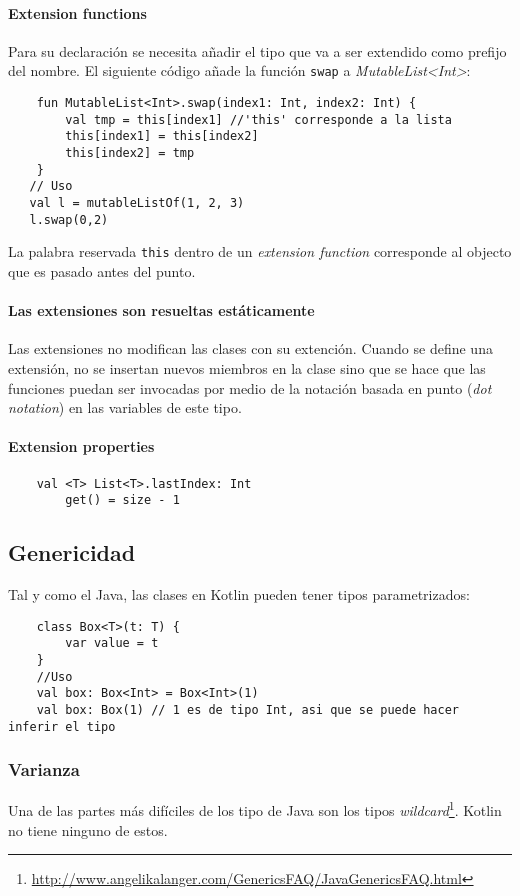\paragraph{Extension functions} Para su declaración se necesita añadir el tipo que va a ser extendido como prefijo del nombre. El siguiente código añade la función \texttt{swap} a \emph{MutableList<Int>}:
\begin{verbatim}
    fun MutableList<Int>.swap(index1: Int, index2: Int) {
        val tmp = this[index1] //'this' corresponde a la lista
        this[index1] = this[index2]
        this[index2] = tmp
    }
   // Uso
   val l = mutableListOf(1, 2, 3)
   l.swap(0,2) 
\end{verbatim}
La palabra reservada \texttt{this} dentro de un \emph{extension function} corresponde al objecto que es pasado antes del punto.

\paragraph{Las extensiones son resueltas estáticamente} Las extensiones no modifican las clases con su extención. Cuando se define una extensión, no se insertan nuevos miembros en la clase sino que se hace que las funciones puedan ser invocadas por medio de la notación basada en punto (\emph{dot notation}) en las variables de este tipo.

\paragraph{Extension properties} 
\begin{verbatim}
    val <T> List<T>.lastIndex: Int
        get() = size - 1
\end{verbatim}


\subsection{Genericidad}
Tal y como el Java, las clases en Kotlin pueden tener tipos parametrizados:
\begin{verbatim}
    class Box<T>(t: T) {
        var value = t
    }
    //Uso
    val box: Box<Int> = Box<Int>(1)
    val box: Box(1) // 1 es de tipo Int, asi que se puede hacer inferir el tipo
\end{verbatim}

\subsubsection{Varianza}
Una de las partes más difíciles de los tipo de Java son los tipos \emph{wildcard}\footnote{\url{http://www.angelikalanger.com/GenericsFAQ/JavaGenericsFAQ.html}}. Kotlin no tiene ninguno de estos.

